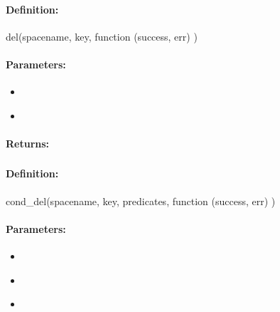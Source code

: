 \paragraph{Definition:}
\begin{javascriptcode}
del(spacename, key, function (success, err) {})
\end{javascriptcode}
\paragraph{Parameters:}
\begin{itemize}[noitemsep]
\item {}\\

\item {}\\

\end{itemize}

\paragraph{Returns:}


\pagebreak
\subsubsection{}
\label{api:nodejs:cond_del}


\paragraph{Definition:}
\begin{javascriptcode}
cond_del(spacename, key, predicates, function (success, err) {})
\end{javascriptcode}
\paragraph{Parameters:}
\begin{itemize}[noitemsep]
\item {}\\

\item {}\\

\item {}\\

\end{itemize}

